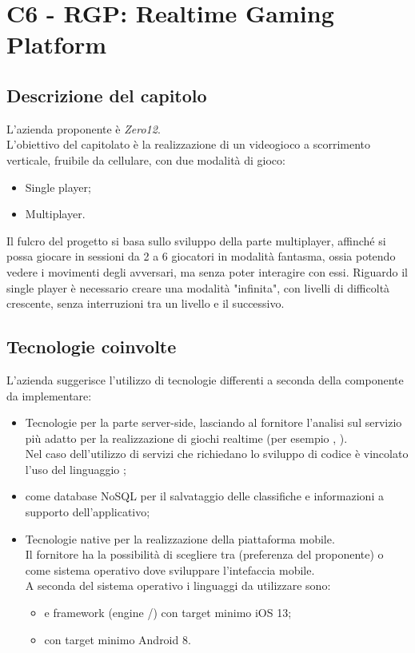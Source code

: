 \section{C6 - RGP: Realtime Gaming Platform}

\subsection{Descrizione del capitolo}
L'azienda proponente è \textit{Zero12}. \\ 
L'obiettivo del capitolato è la realizzazione di un videogioco a scorrimento verticale, fruibile da cellulare, con due modalità di gioco:
\begin{itemize}
\item Single player;
\item Multiplayer.
\end{itemize}  
Il fulcro del progetto si basa sullo sviluppo della parte multiplayer, affinché si possa giocare in sessioni da 2 a 6 giocatori in modalità fantasma, ossia potendo vedere i movimenti degli avversari, ma senza poter interagire con essi.
Riguardo il single player è necessario creare una modalità "infinita", con livelli di difficoltà crescente, senza interruzioni tra un livello e il successivo.

\subsection{Tecnologie coinvolte}
L'azienda suggerisce l'utilizzo di tecnologie differenti a seconda della componente da implementare:
\begin{itemize}
\item Tecnologie  per la parte server-side, lasciando al fornitore l'analisi sul servizio più adatto per la realizzazione di giochi realtime (per esempio , ). \\
Nel caso dell'utilizzo di servizi che richiedano lo sviluppo di codice è vincolato l'uso del linguaggio ;
\item {} come database NoSQL per il salvataggio delle classifiche e informazioni a supporto dell'applicativo; 
\item Tecnologie native per la realizzazione della piattaforma mobile. \\ 
Il fornitore ha la possibilità di scegliere tra  (preferenza del proponente) o  come sistema operativo dove sviluppare l'intefaccia mobile. \\
A seconda del sistema operativo i linguaggi da utilizzare sono:
\begin{itemize}
\item {} e framework  (engine /) con target minimo iOS 13;
\item {} con target minimo Android 8.
\end{itemize}
\end{itemize}

